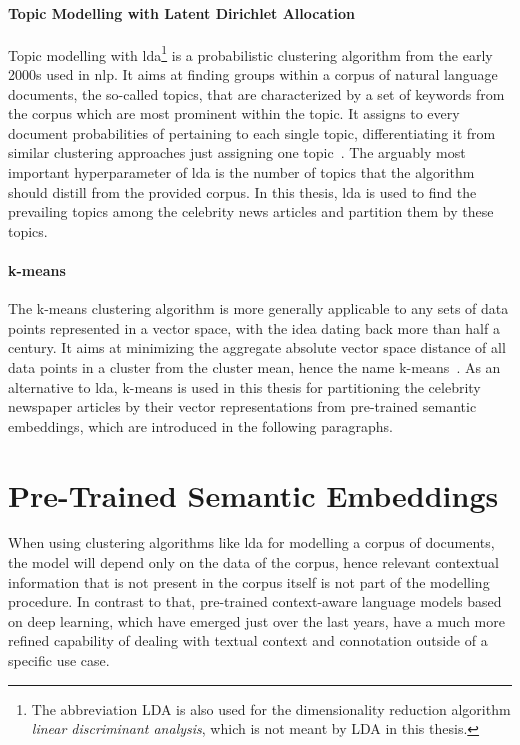 \paragraph{Topic Modelling with Latent Dirichlet Allocation}\label{ch:lda}
Topic modelling with \gls{lda}\footnote{The abbreviation LDA is also used for the dimensionality reduction algorithm \textit{linear discriminant analysis}, which is not meant by LDA in this thesis.} is a probabilistic clustering algorithm from the early 2000s used in \gls{nlp}. It aims at finding groups within a corpus of natural language documents, the so-called topics, that are characterized by a set of keywords from the corpus which are most prominent within the topic. It assigns to every document probabilities of pertaining to each single topic, differentiating it from similar clustering approaches just assigning one topic~\autocite{blei_latent_2003, blei_probabilistic_2012}. The arguably most important hyperparameter of \gls{lda} is the number of topics that the algorithm should distill from the provided corpus. In this thesis, \gls{lda} is used to find the prevailing topics among the celebrity news articles and partition them by these topics.

\paragraph{k-means}
The k-means clustering algorithm is more generally applicable to any sets of data points represented in a vector space, with the idea dating back more than half a century. It aims at minimizing the aggregate absolute vector space distance of all data points in a cluster from the cluster mean, hence the name k-means~\autocite{macqueen_methods_1967}. As an alternative to \gls{lda}, k-means is used in this thesis for partitioning the celebrity newspaper articles by their vector representations from pre-trained semantic embeddings, which are introduced in the following paragraphs.



\section{Pre-Trained Semantic Embeddings}\label{ch:pretrained_algorithms}
When using clustering algorithms like \gls{lda} for modelling a corpus of documents, the model will depend only on the data of the corpus, hence relevant contextual information that is not present in the corpus itself is not part of the modelling procedure. 
In contrast to that, pre-trained context-aware language models based on deep learning, which have emerged just over the last years, have a much more refined capability of dealing with textual context and connotation outside of a specific use case.

